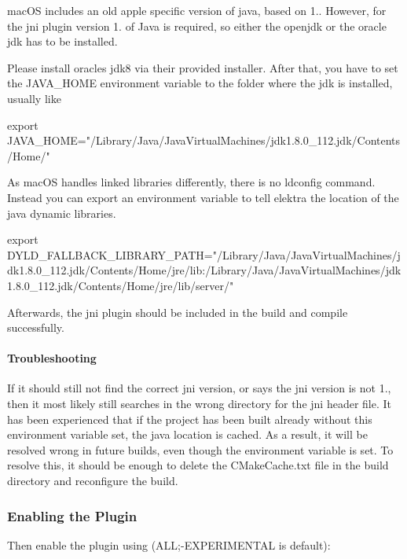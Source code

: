 mac\+OS includes an old apple specific version of java, based on 1.. However, for the jni plugin version 1. of Java is required, so either the openjdk or the oracle jdk has to be installed.

Please install oracle\textquotesingle{}s jdk8 via their provided installer. After that, you have to set the J\+A\+V\+A\+\_\+\+H\+O\+ME environment variable to the folder where the jdk is installed, usually like


\begin{DoxyCode}
export JAVA\_HOME="/Library/Java/JavaVirtualMachines/jdk1.8.0\_112.jdk/Contents/Home/"
\end{DoxyCode}


As mac\+OS handles linked libraries differently, there is no ldconfig command. Instead you can export an environment variable to tell elektra the location of the java dynamic libraries.


\begin{DoxyCode}
export
       DYLD\_FALLBACK\_LIBRARY\_PATH="/Library/Java/JavaVirtualMachines/jdk1.8.0\_112.jdk/Contents/Home/jre/lib:/Library/Java/JavaVirtualMachines/jdk1.8.0\_112.jdk/Contents/Home/jre/lib/server/"
\end{DoxyCode}


Afterwards, the jni plugin should be included in the build and compile successfully.

\paragraph*{Troubleshooting}

If it should still not find the correct jni version, or says the jni version is not 1., then it most likely still searches in the wrong directory for the jni header file. It has been experienced that if the project has been built already without this environment variable set, the java location is cached. As a result, it will be resolved wrong in future builds, even though the environment variable is set. To resolve this, it should be enough to delete the C\+Make\+Cache.\+txt file in the build directory and reconfigure the build.

\subsubsection*{Enabling the Plugin}

Then enable the plugin using ({\ttfamily A\+LL;-\/\+E\+X\+P\+E\+R\+I\+M\+E\+N\+T\+AL} is default)\+:


